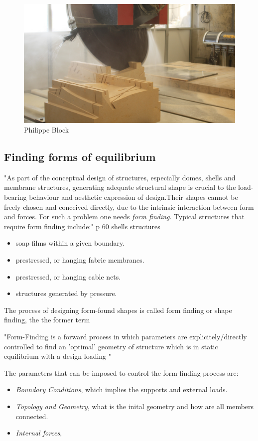 \begin{figure}[H]
\centering
\includegraphics[width=0.8\linewidth ]{figure/Introduction/digitalstereotomyBlock2.jpg}
\caption{Philippe Block}
\end{figure}


\subsection{Finding forms of equilibrium}

"As part of the conceptual design of structures, especially domes, shells and membrane structures, generating adequate structural shape is crucial to the load-bearing behaviour and aesthetic  expression of design.Their shapes cannot be freely chosen and conceived directly, due to the intrinsic interaction between form and forces. For such a problem one needs \textit{form finding}. Typical structures that require form finding include:" p 60 shells structures

\begin{itemize}
\item soap films within a given boundary.
\item prestressed, or hanging fabric membranes.
\item prestressed, or hanging cable nets.
\item structures generated by pressure.
\end{itemize}

The process of designing form-found shapes is called form finding or shape finding, the the former term

"Form-Finding is a forward process in which parameters are explicitely/directly controlled to find an 'optimal' geometry of structure which is in static equilibrium with a design loading "

The parameters that can be imposed to control the form-finding process are:

\begin{itemize}
\item \textit{Boundary Conditions}, which implies the supports and external loads.
\item \textit{Topology and Geometry}, what is the inital geometry and how are all members connected.
\item \textit{Internal forces}, 
\end{itemize}


